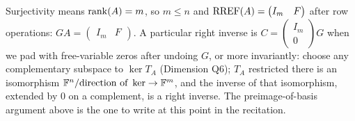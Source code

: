 \begin{laterbox}
Surjectivity means $\operatorname{rank}(A)=m$, so $m\le n$ and
$\operatorname{RREF}(A)=\begin{pmatrix}I_m&F\end{pmatrix}$ after row operations:
$GA=\begin{pmatrix}I_m&F\end{pmatrix}$. A particular right inverse is
$C=\begin{pmatrix}I_m\\0\end{pmatrix}G$ when we pad with free-variable zeros
after undoing $G$, or more invariantly: choose any complementary subspace to
$\ker T_A$ (Dimension Q6); $T_A$ restricted there is an isomorphism
$\mathbb{F}^n/\text{direction of }\ker\to\mathbb{F}^m$, and the inverse of that isomorphism,
extended by $0$ on a complement, is a right inverse. The preimage-of-basis
argument above is the one to write at this point in the recitation.
\end{laterbox}

